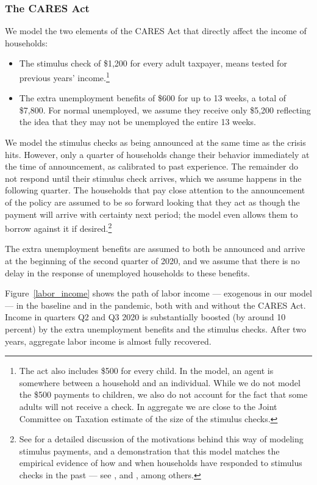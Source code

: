 \subsubsection{The CARES Act}

We model the two elements of the CARES Act that directly affect the income of households:
\begin{itemize}
\item The stimulus check of \$1,200 for every adult taxpayer, means tested for previous years' income.\footnote{The act also includes \$500 for every child. In the model, an agent is somewhere between a household and an individual. While we do not model the \$500 payments to children, we also do not account for the fact that some adults will not receive a check. In aggregate we are close to the Joint Committee on Taxation estimate of the size of the stimulus checks.}
\item The extra unemployment benefits of \$600 for up to 13 weeks, a total of \$7,800.
For normal unemployed, we assume they receive only \$5,200 reflecting the idea that they may not be unemployed the entire 13 weeks.
\end{itemize}

We model the stimulus checks as being announced at the same time as the crisis hits.
However, only a quarter of households change their behavior immediately at the time of announcement, as calibrated to past experience.
The remainder do not respond until their stimulus check arrives, which we assume happens in the following quarter.
The households that pay close attention to the announcement of the policy are assumed to be so forward looking that they act as though the payment will arrive with certainty next period; the model even allows them to borrow against it if desired.\footnote{See \cite{carroll_sticky_2020} for a detailed discussion of the motivations behind this way of modeling stimulus payments, and a demonstration that this model matches the empirical evidence of how and when households have responded to stimulus checks in the past --- see \cite{psjmMPC2008}, \cite{brodaParker} and \cite{parker25million}, among others.}

The extra unemployment benefits are assumed to both be announced and arrive at the beginning of the second quarter of 2020, and we assume that there is no delay in the response of unemployed households to these benefits.


Figure~\ref{labor_income} shows the path of labor income --- exogenous in our model --- in the baseline and in the pandemic, both with and without the CARES Act.
Income in quarters Q2 and Q3 2020 is substantially boosted (by around 10 percent) by the extra unemployment benefits and the stimulus checks.
After two years, aggregate labor income is almost fully recovered.

